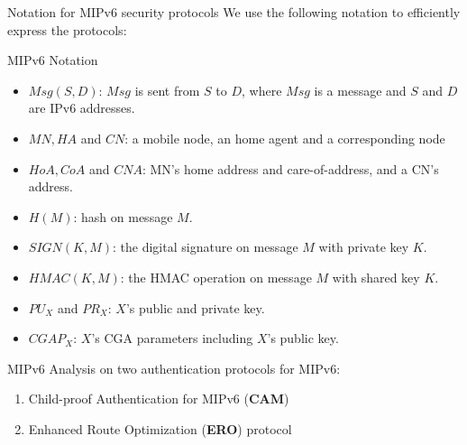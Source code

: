 \documentclass[10pt]{beamer}
\begin{document}
\begin{frame}{Notation for MIPv6 security protocols}
	We use the following notation to efficiently express the protocols:
	\small
	\begin{block}{MIPv6 Notation}
		\begin{itemize}
			\item $Msg(S,D)$: $Msg$ is sent from $S$ to $D$, where $Msg$ is a message and $S$ and $D$ are IPv6 addresses.
			\item $MN,HA$ and $CN$: a mobile node, an home agent and a corresponding node
			\item $HoA, CoA$ and $CNA$: MN's home address and care-of-address, and a CN's address. 
			\item $H(M)$: hash on message $M$. 
			\item $SIGN(K,M)$: the digital signature on message $M$ with private key $K$. 
			\item $HMAC(K,M)$: the HMAC operation on message $M$ with shared key $K$. 
			\item $PU_X$ and $PR_X$: $X$'s public and private key. 
			\item $CGAP_X$: $X$'s CGA parameters including $X$'s public key.
		\end{itemize}
	\end{block}
\end{frame}

\begin{frame}{MIPv6}
	Analysis on two authentication protocols for MIPv6:
	\begin{enumerate}
		\item Child-proof Authentication for MIPv6 (\alert{\textbf{CAM}})
		\item Enhanced Route Optimization (\alert{\textbf{ERO}}) protocol
	\end{enumerate}
\end{frame}
\end{document}

